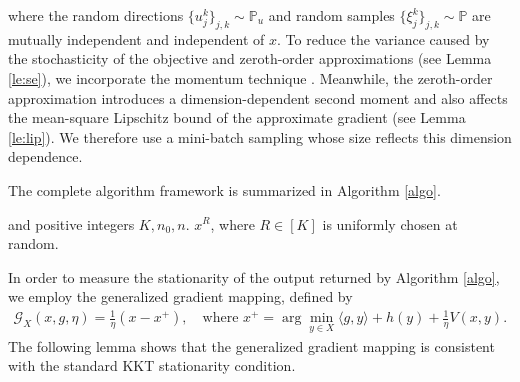 \documentclass[11pt]{article}
\numberwithin{equation}{section}
\begin{document}
where  
the random directions $\{u_j^k\}_{j,k}\sim\mathbb P_u$ and random samples $\{\xi_j^k\}_{j,k}\sim \mathbb P$ are mutually  independent and independent of $x$. To reduce the variance caused by the stochasticity of the objective and zeroth-order approximations (see Lemma \ref{le:se}), we incorporate the momentum technique  \cite{storm,tran2022hybrid}. Meanwhile, the zeroth-order approximation introduces a dimension-dependent second moment and also affects the mean-square Lipschitz bound of the approximate gradient (see Lemma \ref{le:lip}). We therefore use a mini-batch sampling whose size reflects this dimension dependence.

The complete algorithm framework is summarized in Algorithm \ref{algo}.

\begin{algorithm}[ht]
    \caption{Mirror  descent linearized augmented Lagrangian method}
    \label{algo}
    \begin{algorithmic}[1]
    \REQUIRE{$x^0\in X, \lambda^0 = 0,$ positive parameters $ \mu, \eta, \nu, \alpha \in (0,1] , $ $\{\rho_k\in(0,\mu)\}$} and positive integers  $K, n_0, n$. 
    \ENSURE $x^{R}$, where $R \in [K]$ is uniformly chosen at random.
    \ENDFOR
    \end{algorithmic}
\end{algorithm}


In order to measure the stationarity of the output  returned by Algorithm \ref{algo}, we employ the generalized gradient mapping, defined by
\begin{equation*}     \begin{aligned}
    \mathcal{G}_X (x,g,\eta) = \frac{1}{\eta}(x-x^+), \quad \mbox{where $x^+ = \arg \min_{y \in X} \langle g,y \rangle + h(y) + \frac{1}{\eta} V(x,y).$}
\end{aligned}  \end{equation*}  
The following lemma shows that the generalized gradient mapping is consistent with the standard  KKT stationarity condition.
\end{document}
